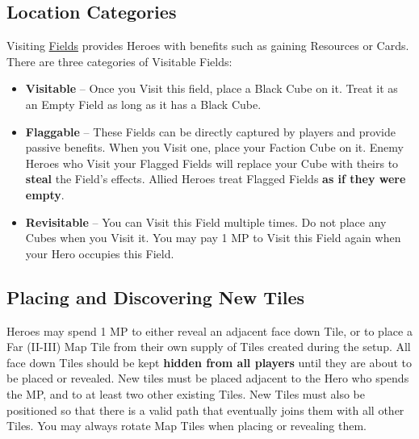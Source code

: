 \begin{multicols}{2}

\subsection*{\hypertarget{Categories}{Location Categories}}
Visiting \hyperlink{All}{Fields} provides Heroes with benefits such as gaining Resources or Cards.
There are three categories of Visitable Fields:
\begin{itemize}
  \item \textbf{Visitable} – Once you Visit this field, place a Black Cube on it.
    Treat it as an Empty Field as long as it has a Black Cube.
  \item \textbf{Flaggable} – These Fields can be directly captured by players and provide passive benefits.
    When you Visit one, place your Faction Cube on it.
    Enemy Heroes who Visit your Flagged Fields will replace your Cube with theirs to \textbf{steal} the Field’s effects.
    Allied Heroes treat Flagged Fields \textbf{as if they were empty}.
  \item \textbf{Revisitable} – You can Visit this Field multiple times.
    Do not place any Cubes when you Visit it.
    You may pay 1 MP to Visit this Field again when your Hero occupies this Field.
\end{itemize}

\subsection*{\hypertarget{Placing}{Placing and Discovering New Tiles}}
Heroes may spend 1 MP to either reveal an adjacent face down Tile, or to place a Far (II-III) Map Tile from their own supply of Tiles created during the setup.
All face down Tiles should be kept \textbf{hidden from all players} until they are about to be placed or revealed.
New tiles must be placed adjacent to the Hero who spends the MP, and to at least two other existing Tiles.
New Tiles must also be positioned so that there is a valid path that eventually joins them with all other Tiles.
You may always rotate Map Tiles when placing or revealing them.

\medskip
{}

\end{multicols}

